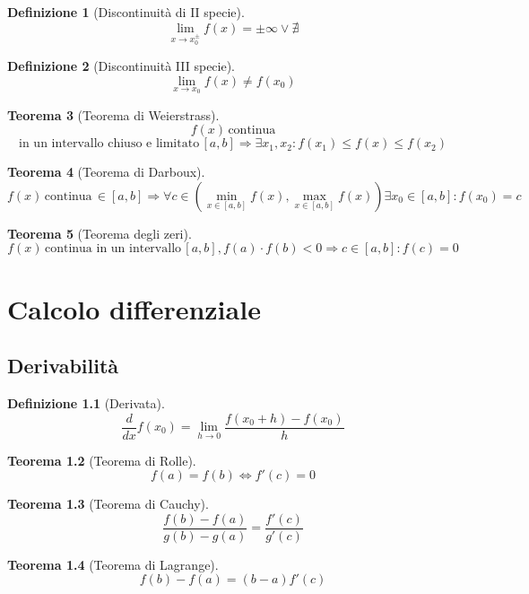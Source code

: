 \documentclass[a4paper,12pt]{report}
\theoremstyle{mystyle}
\newtheorem{theorem}{Teorema}[section]
\newtheorem{definition}[theorem]{Definizione}
\begin{document}
\begin{definition}[Discontinuità di II specie]
    \[\lim_{x \rightarrow x_0^{\pm}} f(x) = \pm \infty \lor \nexists\]
\end{definition}

\begin{definition}[Discontinuità III specie]
    \[\lim_{x \rightarrow x_0} f(x) \neq f (x_0)\]
\end{definition}


\begin{theorem}[Teorema di Weierstrass]
    \[f(x) \, \text{continua}\]
    \[\text{in un intervallo chiuso e limitato} \, [a,b] \Rightarrow \exists x_1,x_2: f(x_1) \leq f(x) \leq f(x_2)\]
\end{theorem}


\begin{theorem}[Teorema di Darboux]
    \[f(x) \, \text{continua} \, \in [a,b] \Rightarrow \forall c \in (\min_{x \in [a,b]} f(x),\max_{x \in [a,b]} f(x)) \exists x_0 \in [a,b] : f(x_0) = c\]
\end{theorem}

\begin{theorem}[Teorema degli zeri]
    \[f(x) \, \text{continua in un intervallo} \, [a,b] , f(a) \cdot f(b) < 0 \Rightarrow c \in [a,b]: f(c) = 0\]
\end{theorem}


\newpage


\chapter{Calcolo differenziale}

\section{Derivabilità}
\begin{definition}[Derivata]
    \[\frac{d}{dx}f(x_0) = \lim_{h \to 0} \frac{f(x_0 + h) - f(x_0)}{h}\]
\end{definition}

\begin{theorem}[Teorema di Rolle]
    \[f(a)=f(b) \Leftrightarrow f'(c)=0\]
\end{theorem}

\begin{theorem}[Teorema di Cauchy]
    \[\frac{f(b)-f(a)}{g(b)-g(a)} = \frac{f'(c)}{g'(c)}\]
\end{theorem}

\begin{theorem}[Teorema di Lagrange]
    \[f(b)-f(a) = (b-a)f'(c)\]
\end{theorem}
\end{document}
